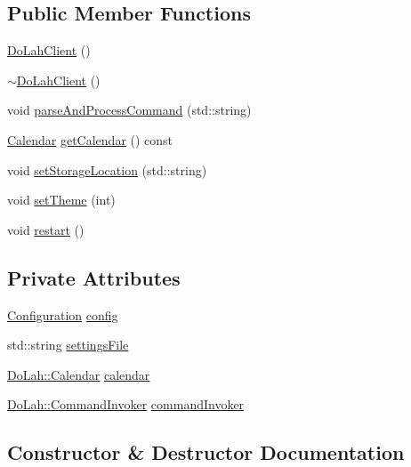 \subsection*{Public Member Functions}
\begin{DoxyCompactItemize}
\item 
\hyperlink{class_do_lah_1_1_do_lah_client_af91cc5a123a0a20c6b55fb3491de0dd7}{Do\+Lah\+Client} ()
\item 
\hyperlink{class_do_lah_1_1_do_lah_client_acb030d8fc57e598cdebd2b7236b994bf}{$\sim$\+Do\+Lah\+Client} ()
\item 
void \hyperlink{class_do_lah_1_1_do_lah_client_a74843a748129cc862416e87c9730d654}{parse\+And\+Process\+Command} (std\+::string)
\item 
\hyperlink{class_do_lah_1_1_calendar}{Calendar} \hyperlink{class_do_lah_1_1_do_lah_client_af4df82f4f39c05462ef0743112d64193}{get\+Calendar} () const 
\item 
void \hyperlink{class_do_lah_1_1_do_lah_client_af0849e1f18ae1983dcea42ed0ed87d4c}{set\+Storage\+Location} (std\+::string)
\item 
void \hyperlink{class_do_lah_1_1_do_lah_client_a8f92063b2a17abe23c361a6e946fbf20}{set\+Theme} (int)
\item 
void \hyperlink{class_do_lah_1_1_do_lah_client_a702e3fcdf119dfb69b8a0fa96b0f5c86}{restart} ()
\end{DoxyCompactItemize}
\subsection*{Private Attributes}
\begin{DoxyCompactItemize}
\item 
\hyperlink{class_do_lah_1_1_configuration}{Configuration} \hyperlink{class_do_lah_1_1_do_lah_client_a01d9d99b4d1db03117fffccb2f4fb81b}{config}
\item 
std\+::string \hyperlink{class_do_lah_1_1_do_lah_client_a65625760378215d86a7578fad09ef779}{settings\+File}
\item 
\hyperlink{class_do_lah_1_1_calendar}{Do\+Lah\+::\+Calendar} \hyperlink{class_do_lah_1_1_do_lah_client_adb2e6fbb727d41de344d163de8c8de33}{calendar}
\item 
\hyperlink{class_do_lah_1_1_command_invoker}{Do\+Lah\+::\+Command\+Invoker} \hyperlink{class_do_lah_1_1_do_lah_client_a53d3d667c3a6b9f20b5709bb4ed886fa}{command\+Invoker}
\end{DoxyCompactItemize}


\subsection{Constructor \& Destructor Documentation}
\hypertarget{class_do_lah_1_1_do_lah_client_af91cc5a123a0a20c6b55fb3491de0dd7}{}
